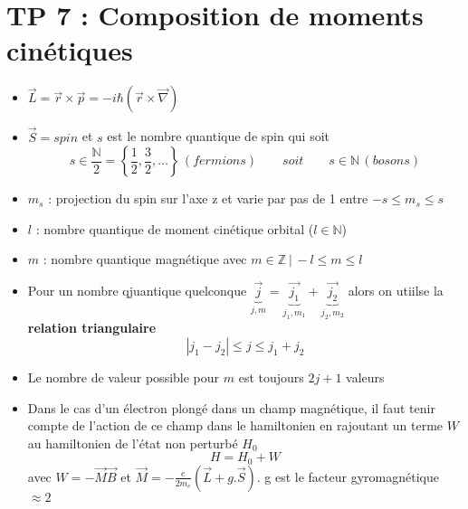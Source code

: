 
\section*{TP 7 : Composition de moments cinétiques}
\begin{itemize}
	\item $\vec{L} = \vec{r}\times \vec{p} = -i\hbar (\vec{r}\times \vec{\nabla})$
	      	
	\item $\vec{S} = spin$ et $s$ est le nombre quantique de spin qui soit 
	      \begin{equation}
	      	s \in \frac{\mathbb{N}}{2} = \left\{ \frac{1}{2}, \frac{3}{2},\dots \right\} \, (fermions) \qquad soit \qquad s \in \mathbb{N} \, (bosons)
	      \end{equation}
	\item $m_s$ : projection du spin sur l'axe z et varie par pas de 1 entre $-s \leq m_s \leq s$
	      	
	\item $l$ : nombre quantique de moment cinétique orbital ($l \in \mathbb{N}$)
	      	
	\item $m$ : nombre quantique magnétique avec $m \in \mathbb{Z} \ |\, -l \leq m \leq l$
	      	
	\item Pour un nombre qjuantique quelconque $\underbrace{\vec{j}}_{j,m} = \underbrace{\vec{j_1}}_{j_1,m_1}+\underbrace{\vec{j_2}}_{j_2,m_2}$ alors on utiilse la \textbf{relation triangulaire} 
	      \begin{equation}
	      	|j_1 -j_2| \leq j \leq j_1+j_2
	      \end{equation}
	      	
	\item Le nombre de valeur possible pour $m$ est toujours $2 j +1$ valeurs
	      	
	\item Dans le cas d'un électron plongé dans un champ magnétique, il faut tenir compte de l'action de ce champ dans le hamiltonien en rajoutant un terme $W$ au hamiltonien de l'état non perturbé $H_0$
	      \begin{equation}
	      	H = H_0 + W
	      \end{equation}
	      avec $W = -\vec{M}\vec{B}$ et $\vec{M} = -\frac{e}{2m_e}(\vec{L}+g.\vec{S})$. g est le facteur gyromagnétique $\approx 2$
\end{itemize}
